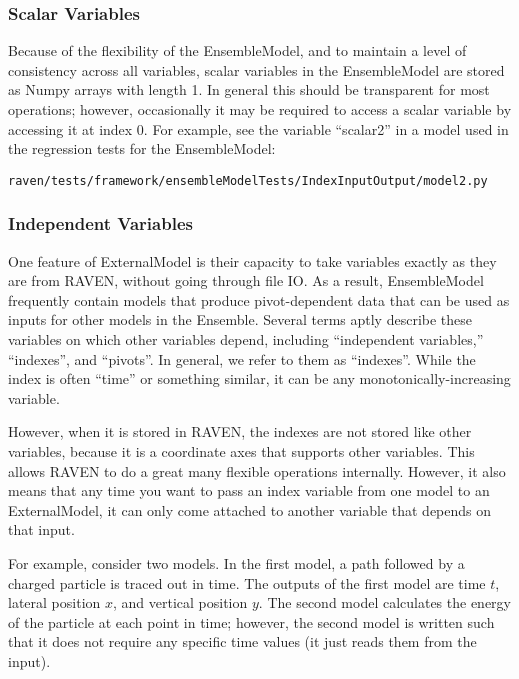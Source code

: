 \subsubsection{Scalar Variables}
Because of the flexibility of the EnsembleModel, and to maintain a level of consistency across all
variables, scalar variables in the EnsembleModel are stored as Numpy arrays with length 1.  In general this
should be transparent for most operations; however, occasionally it may be required to access a scalar
variable by accessing it at index 0.  For example, see the variable ``scalar2'' in a model used in the
regression tests for the EnsembleModel:
\begin{verbatim}
raven/tests/framework/ensembleModelTests/IndexInputOutput/model2.py
\end{verbatim}


\subsubsection{Independent Variables}
One feature of ExternalModel is their capacity to take variables exactly as they are from RAVEN, without
going through file IO.  As a result, EnsembleModel frequently contain models that produce pivot-dependent data
that can be used as inputs for other models in the Ensemble. Several terms aptly describe these variables on
which other variables depend, including ``independent variables,'' ``indexes'', and ``pivots''.  In general,
we refer to them as ``indexes''.  While the index is often ``time'' or something
similar, it can be any monotonically-increasing variable.

However, when it is stored in RAVEN, the indexes are not stored like other variables,
because it is a coordinate axes that supports other variables.  This allows RAVEN to do a great many flexible
operations internally.  However, it also means that any time you want to pass an index variable from one model
to an ExternalModel, it can only come attached to another variable that depends on that input.

For example, consider two models.  In the first model, a path followed by a charged particle is traced out in
time.  The outputs of the first model are time $t$, lateral position $x$, and vertical position $y$.  The
second model calculates the energy of the particle at each point in time; however, the second model is written
such that it does not require any specific time values (it just reads them from the input).

